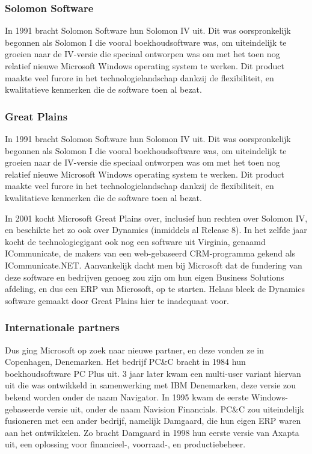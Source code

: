 \subsubsection{Solomon Software }
In 1991 bracht Solomon Software hun Solomon IV uit. Dit was oorspronkelijk begonnen als Solomon I die vooral boekhoudsoftware was, om uiteindelijk te groeien naar de IV-versie die speciaal ontworpen was om met het toen nog relatief nieuwe Microsoft Windows operating system te werken. Dit product maakte veel furore in het technologielandschap dankzij de flexibiliteit, en kwalitatieve kenmerken die de software toen al bezat. 


\subsubsection{Great Plains }
In 1991 bracht Solomon Software hun Solomon IV uit. Dit was oorspronkelijk begonnen als Solomon I die vooral boekhoudsoftware was, om uiteindelijk te groeien naar de IV-versie die speciaal ontworpen was om met het toen nog relatief nieuwe Microsoft Windows operating system te werken. Dit product maakte veel furore in het technologielandschap dankzij de flexibiliteit, en kwalitatieve kenmerken die de software toen al bezat. 

In 2001 kocht Microsoft Great Plains over, inclusief hun rechten over Solomon IV, en beschikte het zo ook over Dynamics (inmiddels al Release 8). In het zelfde jaar kocht de technologiegigant ook nog een software uit Virginia, genaamd ICommunicate, de makers van een web-gebaseerd CRM-programma gekend als ICommunicate.NET. Aanvankelijk dacht men bij Microsoft dat de fundering van deze software en bedrijven genoeg zou zijn om hun eigen Business Solutions afdeling, en dus een ERP van Microsoft, op te starten. Helaas bleek de Dynamics software gemaakt door Great Plains hier te inadequaat voor. 

\subsubsection{Internationale partners }
Dus ging Microsoft op zoek naar nieuwe partner, en deze vonden ze in Copenhagen, Denemarken. Het bedrijf PC\&C bracht in 1984 hun boekhoudsoftware PC Plus uit. 3 jaar later kwam een multi-user variant hiervan uit die was ontwikkeld in samenwerking met IBM Denemarken, deze versie zou bekend worden onder de naam Navigator. In 1995 kwam de eerste Windows-gebaseerde versie uit, onder de naam Navision Financials. PC\&C zou uiteindelijk fusioneren met een ander bedrijf, namelijk Damgaard, die hun eigen ERP waren aan het ontwikkelen. Zo bracht Damgaard in 1998 hun eerste versie van Axapta uit, een oplossing voor financieel-, voorraad-, en productiebeheer.
 
